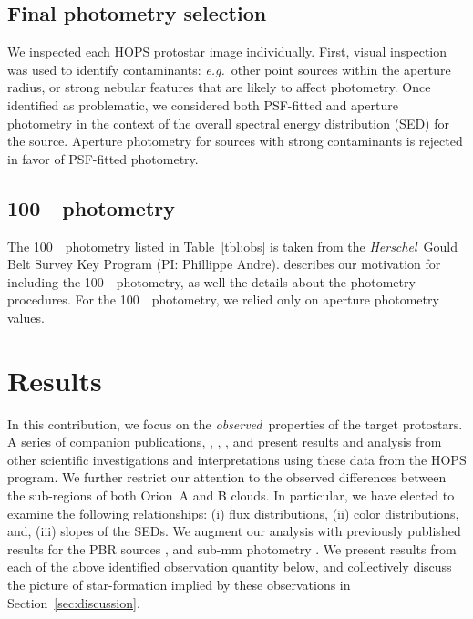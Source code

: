 \documentclass[manuscript]{aastex61}
\newcommand{\herschel}{{\em Herschel}}
\begin{document}
\subsection{Final photometry selection}
\label{sec-eyeballs}
We inspected each HOPS protostar image individually.  First, visual inspection was used to identify contaminants: {\it e.g.}\ other point sources within the aperture radius, or strong nebular features that are likely to affect photometry.  Once identified as problematic, we considered both PSF-fitted and aperture photometry in the context of the overall spectral energy distribution (SED) for the source.  Aperture photometry for sources with strong contaminants is rejected in favor of PSF-fitted photometry.

\subsection{100~\micron\ photometry}
\label{sec:gb100um}
The 100~\micron\ photometry listed in Table~\ref{tbl:obs} is taken from the \herschel\ Gould Belt Survey Key Program (PI: Phillippe Andre).  \cite{pbrpaper} describes our motivation for including the 100~\micron\ photometry, as well the details about the photometry procedures.  For the 100~\micron\ photometry, we relied only on aperture photometry values.

\section{Results}
\label{sec-results}
\par
In this contribution, we focus on the {\em observed}\ properties of the target protostars.  A series of companion publications, \cite{will}, \cite{furlan}, \cite{erin}, and \cite{pbrpaper} present results and analysis from other scientific investigations and interpretations using these data from the HOPS program.   We further restrict our attention to the observed differences between the sub-regions of both Orion~A and B clouds.  In particular, we have elected to examine the following relationships: (i) flux distributions, (ii) color distributions, and, (iii) slopes of the SEDs.  We augment our analysis with previously published results for the PBR sources \cite{pbrpaper}, and sub-mm photometry \citep{thomas}.  We present results from each of the above identified observation quantity below, and collectively discuss the picture of star-formation implied by these observations in Section~\ref{sec:discussion}.
\end{document}
